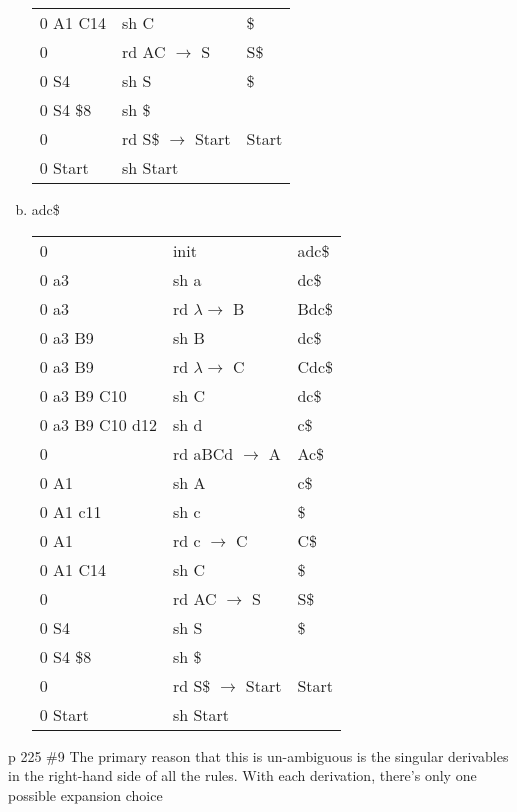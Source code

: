 \documentclass[11pt]{article}
\begin{document}
\begin{enumerate}[(a)]
\begin{tabular}{|l|l|l|}
                0 A1 C14& sh C          & \$ \\
                0       & rd AC $\to$ S & S\$ \\
                0 S4    & sh S          & \$ \\
                0 S4 \$8& sh \$         & \\
                0       & rd S\$ $\to$ Start & Start \\
                0 Start & sh Start      &
            \end{tabular}
        \item adc\$ \\
            \begin{tabular}{|l|l|l|}
                0       & init          & adc\$ \\
                0 a3    & sh a          & dc\$ \\
                0 a3    & rd $\lambda \to$ B & Bdc\$ \\
                0 a3 B9 & sh B          & dc\$ \\
                0 a3 B9 & rd $\lambda \to$ C & Cdc\$ \\
                0 a3 B9 C10& sh C       & dc\$ \\
                0 a3 B9 C10 d12& sh d   & c\$ \\
                0       & rd aBCd $\to$ A & Ac\$ \\
                0 A1    & sh A          & c\$ \\
                0 A1 c11& sh c          & \$ \\
                0 A1    & rd c $\to$ C  & C\$ \\
                0 A1 C14& sh C          & \$ \\
                0       & rd AC $\to$ S & S\$ \\
                0 S4    & sh S          & \$ \\
                0 S4 \$8& sh \$         & \\
                0       & rd S\$ $\to$ Start & Start \\
                0 Start & sh Start      &
            \end{tabular}
    \end{enumerate}

    p 225 \#9
    The primary reason that this is un-ambiguous is the singular derivables in
    the right-hand side of all the rules. With each derivation, there's only
    one possible expansion choice \\
\end{document}

